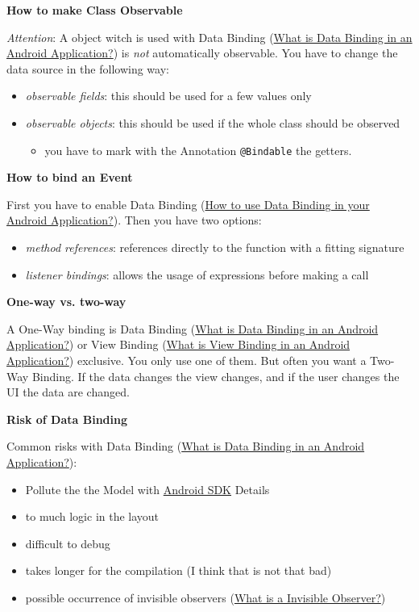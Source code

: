 \documentclass[11pt,twoside,landscape]{article}
\begin{document}
\begin{multicols}{3}
\textbf{How to make Class Observable}

\emph{Attention}: A object witch is used with Data Binding (\href{../../../roam/20211112100504-what_is_data_binding_in_an_android_application.org}{What is Data Binding in an Android Application?}) is \emph{not} automatically observable.
You have to change the data source in the following way:
\begin{itemize}
\item \emph{observable fields}:  this should be used for a few values only
\item \emph{observable objects}: this should be used if the whole class should be observed
\begin{itemize}
\item you have to mark with the Annotation \texttt{@Bindable} the getters.
\end{itemize}
\end{itemize}


\textbf{How to bind an Event}

First you have to enable Data Binding (\href{../../../roam/20211112101553-how_to_use_data_binding_in_your_android_application.org}{How to use Data Binding in your Android Application?}).
Then you have two options:
\begin{itemize}
\item \emph{method references}: references directly to the function with a fitting signature
\item \emph{listener bindings}: allows the usage of expressions before making a call
\end{itemize}


\textbf{One-way vs. two-way}

A One-Way binding is Data Binding (\href{../../../roam/20211112100504-what_is_data_binding_in_an_android_application.org}{What is Data Binding in an Android Application?}) or View Binding (\href{../../../roam/20211112094953-what_is_view_binding_in_an_android_application.org}{What is View Binding in an Android Application?}) exclusive.
You only use one of them.
But often you want a Two-Way Binding.
If the data changes the view changes, and if the user changes the UI the data are changed.

\textbf{Risk of Data Binding}

Common risks with Data Binding (\href{../../../roam/20211112100504-what_is_data_binding_in_an_android_application.org}{What is Data Binding in an Android Application?}):
\begin{itemize}
\item Pollute the the Model with \href{../../../roam/20210928175951-android_sdk.org}{Android SDK} Details
\item to much logic in the layout
\item difficult to debug
\item takes longer for the compilation (I think that is not that bad)
\item possible occurrence of invisible observers (\href{../../../roam/20211112110032-what_is_a_invisible_observer.org}{What is a Invisible Observer?})
\end{itemize}



\end{multicols}
\end{document}
